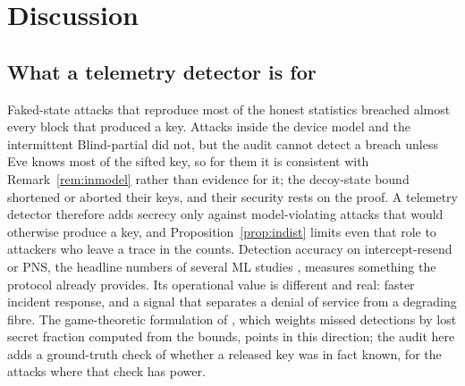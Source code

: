 \section{Discussion}\label{sec:discussion}

\subsection{What a telemetry detector is for}
Faked-state attacks that reproduce most of the honest statistics breached almost every block that produced a key. Attacks inside the device model and the intermittent Blind-partial did not, but the audit cannot detect a breach unless Eve knows most of the sifted key, so for them it is consistent with Remark~\ref{rem:inmodel} rather than evidence for it; the decoy-state bound shortened or aborted their keys, and their security rests on the proof. A telemetry detector therefore adds secrecy only against model-violating attacks that would otherwise produce a key, and Proposition~\ref{prop:indist} limits even that role to attackers who leave a trace in the counts. Detection accuracy on intercept-resend or PNS, the headline numbers of several ML studies \cite{isha2026,alkuwari2026}, measures something the protocol already provides. Its operational value is different and real: faster incident response, and a signal that separates a denial of service from a degrading fibre. The game-theoretic formulation of \cite{mohamed2026}, which weights missed detections by lost secret fraction computed from the bounds, points in this direction; the audit here adds a ground-truth check of whether a released key was in fact known, for the attacks where that check has power.

